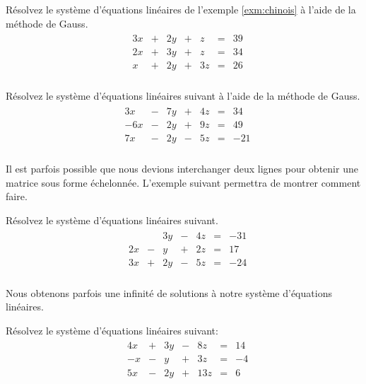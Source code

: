 \documentclass[]{book}
\theoremstyle{definition}
\theoremstyle{definition}
\theoremstyle{definition}
\theoremstyle{remark}
\let\BeginKnitrBlock\begin \let\EndKnitrBlock\end
\begin{document}
\BeginKnitrBlock{example}
\protect\hypertarget{exm:unnamed-chunk-23}{}{\label{exm:unnamed-chunk-23} }Résolvez le système d'équations linéaires de l'exemple \ref{exm:chinois} à l'aide de la méthode de Gauss.
\begin{align*}
\begin{array}{cccccccc}
&3x&+&2y&+&z&=&39\\
&2x&+&3y&+&z&=&34\\
&x&+&2y&+&3z&=&26\\
\end{array}
\end{align*}
\EndKnitrBlock{example}

\BeginKnitrBlock{example}
\protect\hypertarget{exm:unnamed-chunk-24}{}{\label{exm:unnamed-chunk-24} }Résolvez le système d'équations linéaires suivant à l'aide de la méthode de Gauss.
\begin{align*}
\begin{array}{cccccccc}
&3x&-&7y&+&4z&=&34\\
&-6x&-&2y&+&9z&=&49\\
&7x&-&2y&-&5z&=&-21\\
\end{array}
\end{align*}
\EndKnitrBlock{example}

Il est parfois possible que nous devions interchanger deux lignes pour obtenir une matrice sous forme échelonnée. L'exemple suivant permettra de montrer comment faire.

\BeginKnitrBlock{example}
\protect\hypertarget{exm:unnamed-chunk-25}{}{\label{exm:unnamed-chunk-25} }Résolvez le système d'équations linéaires suivant.
\begin{align*}
\begin{array}{cccccccc}
&&&3y&-&4z&=&-31\\
&2x&-&y&+&2z&=&17\\
&3x&+&2y&-&5z&=&-24\\
\end{array}
\end{align*}
\EndKnitrBlock{example}

Nous obtenons parfois une infinité de solutions à notre système d'équations linéaires.

\BeginKnitrBlock{example}
\protect\hypertarget{exm:unnamed-chunk-26}{}{\label{exm:unnamed-chunk-26} }Résolvez le système d'équations linéaires suivant:
\begin{align*}
\begin{array}{cccccccc}
&4x&+&3y&-&8z&=&14\\
&-x&-&y&+&3z&=&-4\\
&5x&-&2y&+&13z&=&6\\
\end{array}
\end{align*}
\EndKnitrBlock{example}
\end{document}
